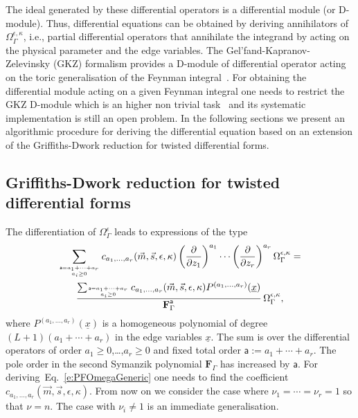 \documentclass[a4paper,12pt]{article}
\numberwithin{equation}{section}
\numberwithin{figure}{section}
\begin{document}
The ideal  generated by these
differential operators is a differential module (or D-module).  Thus,
differential equations can be obtained by deriving  annihilators  of
$\Omega_\Gamma^{\epsilon,\kappa}$, i.e., partial differential operators that
annihilate  the integrand by acting on the physical parameter and the
edge variables.   The Gel'fand-Kapranov-Zelevinsky (GKZ) formalism provides
a D-module of differential operator acting on the toric generalisation
of the Feynman
integral~\cite{Vanhove:2018mto,delaCruz:2019skx,Klausen:2019hrg,Feng:2019bdx,Klemm:2019dbm,Ananthanarayan:2022ntm,Agostini:2022cgv,
	Munch:2022ouq}.  For obtaining the differential module acting on a
given Feynman integral one needs to restrict the GKZ  D-module which
is an higher non trivial task~\cite{delaCruz:2019skx,Chestnov:2023kww} and its systematic implementation is
still an open problem. In the following sections we present an
algorithmic procedure for deriving the differential equation based on
an extension of the Griffiths-Dwork reduction for twisted differential forms.



\subsection{Griffiths-Dwork reduction for twisted differential forms}\label{sec:griff-dwork-reduct}
The    differentiation of $\Omega_\Gamma^\epsilon$ 
leads  to  expressions of the type 
\begin{multline}\label{e:PDE}
\sum_{\mathsf{a}=a_1+\cdots+a_r\atop
  a_i\geq0}c_{a_1,\dots,a_r}(\vec m,\vec s,\epsilon,\kappa)\left(\partial\over \partial z_1\right)^{a_1}\cdots\left(\partial
  \over\partial z_r\right)^{a_r} \Omega_\Gamma^{\epsilon,\kappa}=\cr
{ \sum_{\mathsf{a}=a_1+\cdots+a_r\atop a_i\geq0}
  c_{a_1,\dots,a_r}(\vec m,\vec s,\epsilon,\kappa)  P^{(a_1,\dots,a_r)}(\underline x)\over \textbf{F}_\Gamma^{\mathsf {a}}}\, \Omega_\Gamma^{\epsilon,\kappa},
\end{multline}
where 
$  P^{(a_1,\dots,a_r)}(\underline x)$ is a
  homogeneous polynomial of degree $(L+1)(a_1+\cdots+a_r)$ in
  the edge variables $\underline x$.
  The sum is over the differential operators of order
  $a_1\geq0$,\dots,$a_r\geq0$ and fixed total order $\mathsf{a}:=a_1+\cdots +a_r$. 
The
  pole order in the second Symanzik polynomial $\textbf{F}_\Gamma$ has increased by
  $\mathsf a$. 
  For deriving~Eq.~\eqref{e:PFOmegaGeneric} one needs to find the
  coefficient $ c_{a_1,\dots,a_r}(\vec m,\vec s,\epsilon,\kappa)$.  From now on we consider the case where
  $\nu_1=\cdots=\nu_r=1$ so that $\nu=n$. The case with $\nu_i\neq1$
  is an immediate generalisation.
\end{document}

